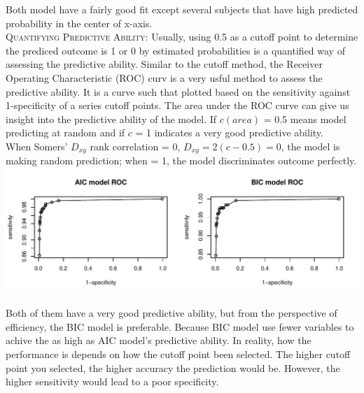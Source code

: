 \documentclass[11pt]{article}\usepackage[]{graphicx}\usepackage[]{color}
\makeatletter
\def\maxwidth{ %
  \ifdim\Gin@nat@width>\linewidth
    \linewidth
  \else
    \Gin@nat@width
  \fi
}
\newenvironment{knitrout}{}{} %
\makeatother
\begin{document}
Both model have a fairly good fit except several subjects that have high predicted probability in the center of x-axis.\\

\textsc{Quantifying Predictive Ability:} Usually, using 0.5 as a cutoff point to determine the prediced outcome is 1 or 0 by estimated probabilities is a quantified way of assessing the predictive ability. Similar to the cutoff method, the Receiver Operating Characteristic (ROC) curv is a very usful method to assess the predictive ability. It is a curve such that plotted based on the sensitivity against 1-specificity of a series cutoff points. The area under the ROC curve can give us insight into the predictive ability of the model. If $c(area)$ =  0.5 means model predicting at random and if $c$ = 1 indicates a very good predictive ability.\\
When Somers' $D_{xy}$ rank correlation = 0, $D_{xy}=2(c-0.5)= 0$, the model is making random prediction; when = 1, the model discriminates outcome perfectly.\\

\begin{knitrout}
\color{fgcolor}
\includegraphics[width=\maxwidth]{figure/ROV_curve} 

\end{knitrout}


\begin{table}[ht]
\centering
{}
\end{table}

Both of them have a very good predictive ability, but from the perspective of efficiency, the BIC model is preferable. Because BIC model use fewer variables to achive the as high as AIC model's predictive ability. 
In reality, how the performance is depends on how the cutoff point been selected. The higher cutoff point you selected, the higher accuracy the prediction would be. However, the higher sensitivity would lead to a poor specificity.
\end{document}
